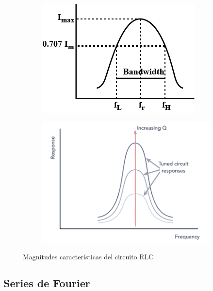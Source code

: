 \documentclass[a4paper,12pt,titlepage]{article}
\begin{document}
\begin{figure}[h!]
    \centering
    \begin{subfigure}{0.45\textwidth}
        \includegraphics[width=0.95\linewidth]{fourier/band_width.png}
    \end{subfigure}
    \begin{subfigure}{0.45\textwidth}
        \includegraphics[width=0.95\linewidth]{fourier/q_factor.png}
    \end{subfigure}
    \caption{Magnitudes características del circuito RLC}
    \label{fig:enter-label}
\end{figure}

\subsection{Series de Fourier}
\end{document}
